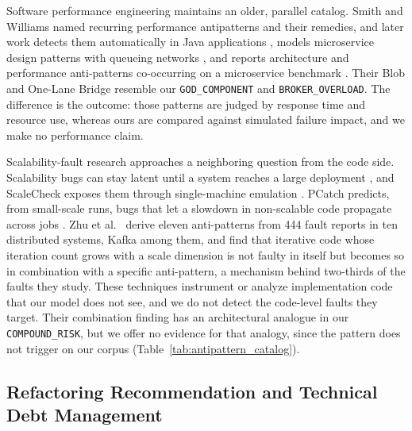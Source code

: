 Software performance engineering maintains an older, parallel catalog. Smith and Williams \citep{smith2000software, smith2002new} named recurring performance antipatterns and their remedies, and later work detects them automatically in Java applications \citep{trubiani2023automated}, models microservice design patterns with queueing networks \citep{pinciroli2023performance}, and reports architecture and performance anti-patterns co-occurring on a microservice benchmark \citep{avritzer2025architecture}. Their Blob and One-Lane Bridge resemble our \texttt{GOD\_COMPONENT} and \texttt{BROKER\_OVERLOAD}. The difference is the outcome: those patterns are judged by response time and resource use, whereas ours are compared against simulated failure impact, and we make no performance claim.

Scalability-fault research approaches a neighboring question from the code side. Scalability bugs can stay latent until a system reaches a large deployment \citep{leesatapornwongsa2017scalability}, and ScaleCheck exposes them through single-machine emulation \citep{stuardo2019scalecheck}. PCatch predicts, from small-scale runs, bugs that let a slowdown in non-scalable code propagate across jobs \citep{li2018pcatch}. Zhu et al.\ \citep{zhu2026understanding} derive eleven anti-patterns from 444 fault reports in ten distributed systems, Kafka among them, and find that iterative code whose iteration count grows with a scale dimension is not faulty in itself but becomes so in combination with a specific anti-pattern, a mechanism behind two-thirds of the faults they study. These techniques instrument or analyze implementation code that our model does not see, and we do not detect the code-level faults they target. Their combination finding has an architectural analogue in our \texttt{COMPOUND\_RISK}, but we offer no evidence for that analogy, since the pattern does not trigger on our corpus (Table~\ref{tab:antipattern_catalog}).

\subsection{Refactoring Recommendation and Technical Debt Management}
\label{sec:related:refactoring}

